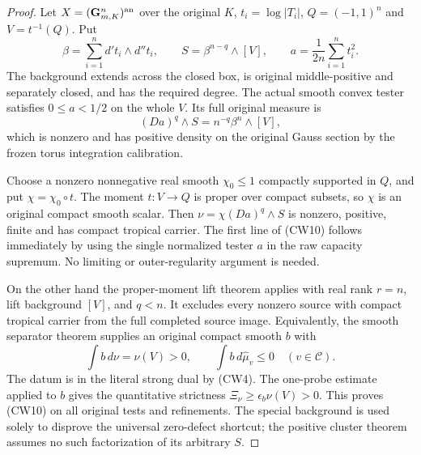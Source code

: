 \documentclass[11pt,a4paper]{article}
\numberwithin{equation}{section}
\theoremstyle{definition}
\theoremstyle{remark}
\begin{document}
\begin{proof}
Let $X=(\mathbf G_{m,K}^n)^{\rm an}$ over the original $K$,
$t_i=\log|T_i|$, $Q=(-1,1)^n$ and $V=t^{-1}(Q)$. Put
\[
       \beta=\sum_{i=1}^n d't_i\wedge d''t_i,
       \qquad S=\beta^{n-q}\wedge[V],
       \qquad a=\frac{1}{2n}\sum_{i=1}^n t_i^2.
 \tag{CW11}
\]
The background extends across the closed box, is original
middle-positive and separately closed, and has the required
degree. The actual smooth convex tester satisfies $0\leq a<1/2$
on the whole $V$. Its full original measure is
\[
                      (Da)^q\wedge S=n^{-q}\beta^n\wedge[V],
 \tag{CW12}
\]
which is nonzero and has positive density on the original
Gauss section by the frozen torus integration calibration.

Choose a nonzero nonnegative real smooth $\chi_0\leq1$
compactly supported in $Q$, and put $\chi=\chi_0\circ t$.
The moment $t:V\to Q$ is proper over compact subsets,
so $\chi$ is an original compact smooth scalar.
Then $\nu=\chi(Da)^q\wedge S$ is nonzero, positive,
finite and has compact tropical carrier.
The first line of (CW10) follows immediately by using the
single normalized tester $a$ in the raw capacity supremum.
No limiting or outer-regularity argument is needed.

On the other hand the proper-moment lift theorem applies
with real rank $r=n$, lift background $[V]$, and $q<n$.
It excludes every nonzero source with compact tropical
carrier from the full completed source image. Equivalently,
the smooth separator theorem supplies an original compact
smooth $b$ with
\[
       \int b\,d\nu=\nu(V)>0,\qquad
       \int b\,d\widehat\mu_v\leq0
                                      \quad(v\in\mathscr C).
 \tag{CW13}
\]
The datum is in the literal strong dual by (CW4).
The one-probe estimate applied to $b$ gives the quantitative
strictness $\Xi_\nu\geq\epsilon_b\nu(V)>0$.
This proves (CW10) on all original tests and refinements.
The special background is used solely to disprove the
universal zero-defect shortcut; the positive cluster theorem
assumes no such factorization of its arbitrary $S$.
\end{proof}
\end{document}
